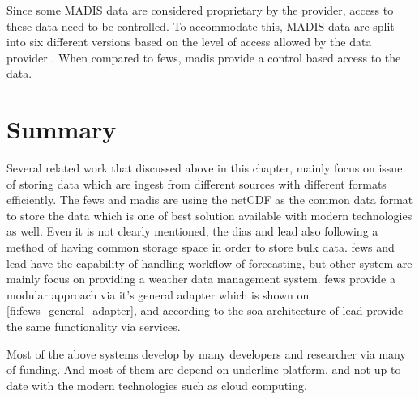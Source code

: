 Since some MADIS data are considered proprietary by the provider, access to these data need to be controlled. To accommodate this, MADIS data are split into six different versions based on the level of access allowed by the data provider \cite{Macdermaid2005ARCHITECTUREP2.39}. When compared to \acrshort{fews}, \acrshort{madis} provide a control based access to the data.



\section{Summary}
\label{se:lit_summary}
Several related work that discussed above in this chapter, mainly focus on issue of storing data which are ingest from different sources with different formats efficiently. The \acrshort{fews} and \acrshort{madis} are using the \acrshort{netCDF} as the common data format to store the data which is one of best solution available with modern technologies as well. Even it is not clearly mentioned, the \acrshort{dias} and \acrshort{lead} also following a method of having common storage space in order to store bulk data.
\acrshort{fews} and \acrshort{lead} have the capability of handling workflow of forecasting, but other system are mainly focus on providing a weather data management system.
\acrshort{fews} provide a modular approach via it's general adapter which is shown on \cref{fi:fews_general_adapter}, and according to the \acrshort{soa} architecture of \acrshort{lead} provide the same functionality via services.

Most of the above systems develop by many developers and researcher via many of funding. And most of them are depend on underline platform, and not up to date with the modern technologies such as cloud computing.
